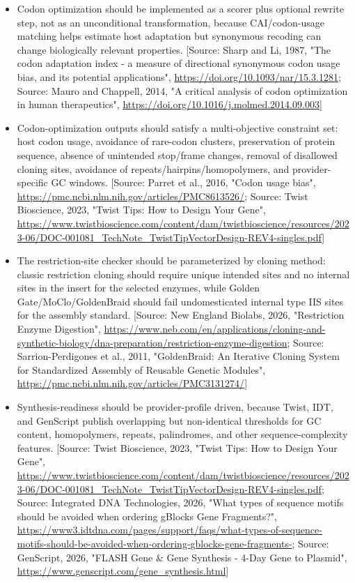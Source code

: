 \documentclass[11pt]{report}
\begin{document}
\begin{itemize}
\item Codon optimization should be implemented as a scorer plus optional rewrite step, not as an unconditional transformation, because CAI/codon-usage matching helps estimate host adaptation but synonymous recoding can change biologically relevant properties. [Source: Sharp and Li, 1987, "The codon adaptation index - a measure of directional synonymous codon usage bias, and its potential applications", \url{https://doi.org/10.1093/nar/15.3.1281}; Source: Mauro and Chappell, 2014, "A critical analysis of codon optimization in human therapeutics", \url{https://doi.org/10.1016/j.molmed.2014.09.003}]
\item Codon-optimization outputs should satisfy a multi-objective constraint set: host codon usage, avoidance of rare-codon clusters, preservation of protein sequence, absence of unintended stop/frame changes, removal of disallowed cloning sites, avoidance of repeats/hairpins/homopolymers, and provider-specific GC windows. [Source: Parret et al., 2016, "Codon usage bias", \url{https://pmc.ncbi.nlm.nih.gov/articles/PMC8613526/}; Source: Twist Bioscience, 2023, "Twist Tips: How to Design Your Gene", \url{https://www.twistbioscience.com/content/dam/twistbioscience/resources/2023-06/DOC-001081_TechNote_TwistTipVectorDesign-REV4-singles.pdf}]
\item The restriction-site checker should be parameterized by cloning method: classic restriction cloning should require unique intended sites and no internal sites in the insert for the selected enzymes, while Golden Gate/MoClo/GoldenBraid should fail undomesticated internal type IIS sites for the assembly standard. [Source: New England Biolabs, 2026, "Restriction Enzyme Digestion", \url{https://www.neb.com/en/applications/cloning-and-synthetic-biology/dna-preparation/restriction-enzyme-digestion}; Source: Sarrion-Perdigones et al., 2011, "GoldenBraid: An Iterative Cloning System for Standardized Assembly of Reusable Genetic Modules", \url{https://pmc.ncbi.nlm.nih.gov/articles/PMC3131274/}]
\item Synthesis-readiness should be provider-profile driven, because Twist, IDT, and GenScript publish overlapping but non-identical thresholds for GC content, homopolymers, repeats, palindromes, and other sequence-complexity features. [Source: Twist Bioscience, 2023, "Twist Tips: How to Design Your Gene", \url{https://www.twistbioscience.com/content/dam/twistbioscience/resources/2023-06/DOC-001081_TechNote_TwistTipVectorDesign-REV4-singles.pdf}; Source: Integrated DNA Technologies, 2026, "What types of sequence motifs should be avoided when ordering gBlocks Gene Fragments?", \url{https://www3.idtdna.com/pages/support/faqs/what-types-of-sequence-motifs-should-be-avoided-when-ordering-gblocks-gene-fragments-}; Source: GenScript, 2026, "FLASH Gene \& Gene Synthesis - 4-Day Gene to Plasmid", \url{https://www.genscript.com/gene_synthesis.html}]

\end{itemize}
\end{document}
